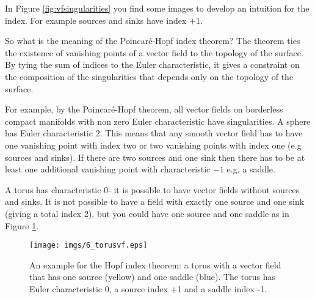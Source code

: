 In Figure \ref{fig:vfsingularities} you find some images to develop an intuition for the index. For example sources and sinks have index $+1$.


So what is the meaning of the Poincar\'e-Hopf index theorem? 
The theorem ties the existence of vanishing points of a vector field to the topology of the surface. By tying the sum of indices to the Euler characteristic, it gives a constraint on the composition of the singularities that depends only on the topology of the surface.

For example, by the Poincar\'e-Hopf theorem, all vector fields on borderless compact manifolds with non zero Euler characteristic have singularities. A sphere has Euler characteristic $2$. This means that any smooth vector field has to have one vanishing point with index two or two vanishing points with index one (e.g sources and sinks). If there are two sources and one sink then there has to be at least one additional vanishing point with characteristic $-1$ e.g. a saddle. 

A torus has characteristic $0$- it is possible to have vector fields without sources and sinks. It is not possible to have a field with exactly one source and one sink (giving a total index 2), but you could have one source and one saddle as in Figure \ref{fig:torusvf}. 

\begin{figure}%
\texttt{[image: imgs/6\_torusvf.eps]}%
\caption{An example for the Hopf index theorem: a torus with a vector field that has one source (yellow) and one saddle (blue). The torus has Euler characteristic 0, a source index +1 and a saddle index -1.}%
\label{fig:torusvf}%
\end{figure}

